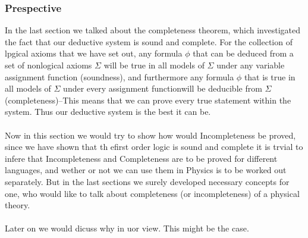 \documentclass[10pt,a4paper]{article}
\newcounter{theo}
\begin{document}
                    \subsubsection{Prespective}
                        In the last section we talked about the completeness theorem, which investigated the fact that our deductive system is sound and complete. For the collection of lpgical axioms that we have set out, any formula $\phi$ that can be deduced from a set of nonlogical axioms $\Sigma$ will be true in all models of $\Sigma$ under any variable assignment function (soundness), and furthermore any formula $\phi$ that is true in all models of $\Sigma$ under every assignment functionwill be deducible from $\Sigma$ (completeness)--This means that we can prove every true statement within the system. Thus our deductive system is the best it can be.
                        \\
                        \\
                        Now in this section we would try to show how would Incompleteness be proved, since we have shown that th efirst order logic is sound and complete it is trvial to infere that Incompleteness and Completeness are to be proved for different languages, and wether or not we can use them in Physics is to be worked out separately. But in the last sections we surely developed necessary concepts for one, who would like to talk about completeness (or incompleteness) of a physical theory.
                        \\
                        \\
                        Later on we would dicuss why in uor view. This might be the case.
\end{document}
